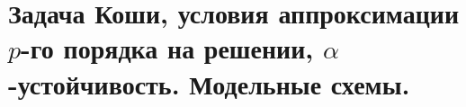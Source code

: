 \section{Задача Коши, условия аппроксимации $p$-го порядка на решении, $\alpha$-устойчивость. Модельные схемы.}
